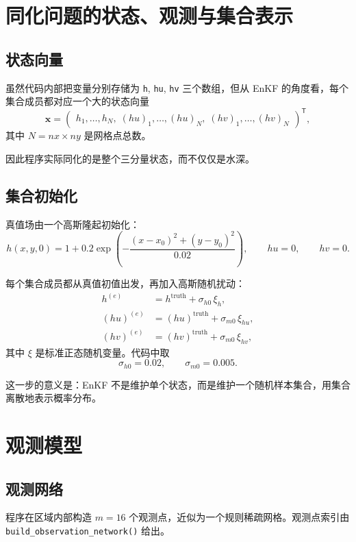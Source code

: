 \documentclass[12pt,a4paper]{article}
\begin{document}
\section{同化问题的状态、观测与集合表示}

\subsection{状态向量}

虽然代码内部把变量分别存储为 \texttt{h}, \texttt{hu}, \texttt{hv} 三个数组，但从 EnKF 的角度看，每个集合成员都对应一个大的状态向量
\[
\mathbf{x} =
\begin{pmatrix}
h_1,\dots,h_N,\;
(hu)_1,\dots,(hu)_N,\;
(hv)_1,\dots,(hv)_N
\end{pmatrix}^{\mathsf T},
\]
其中 $N=nx \times ny$ 是网格点总数。

因此程序实际同化的是整个三分量状态，而不仅仅是水深。

\subsection{集合初始化}

真值场由一个高斯隆起初始化：
\[
h(x,y,0) = 1 + 0.2\exp\left(-\frac{(x-x_0)^2+(y-y_0)^2}{0.02}\right),
\qquad hu=0,\qquad hv=0.
\]

每个集合成员都从真值初值出发，再加入高斯随机扰动：
\begin{align*}
h^{(e)} &= h^{\mathrm{truth}} + \sigma_{h0}\,\xi_h, \\
(hu)^{(e)} &= (hu)^{\mathrm{truth}} + \sigma_{m0}\,\xi_{hu}, \\
(hv)^{(e)} &= (hv)^{\mathrm{truth}} + \sigma_{m0}\,\xi_{hv},
\end{align*}
其中 $\xi$ 是标准正态随机变量。代码中取
\[
\sigma_{h0}=0.02,\qquad \sigma_{m0}=0.005.
\]

这一步的意义是：EnKF 不是维护单个状态，而是维护一个随机样本集合，用集合离散地表示概率分布。

\section{观测模型}

\subsection{观测网络}

程序在区域内部构造 $m=16$ 个观测点，近似为一个规则稀疏网格。观测点索引由 \texttt{build\_observation\_network()} 给出。
\end{document}
